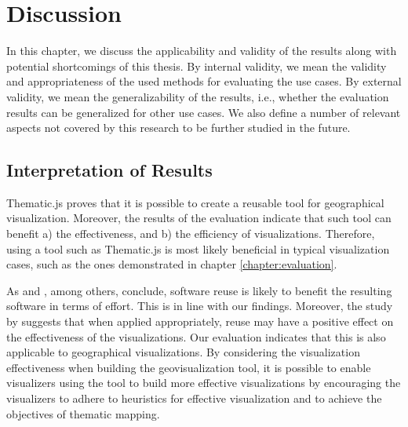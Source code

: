
\chapter{Discussion}
\label{chapter:discussion}

In this chapter, we discuss the applicability and validity of the results along with potential shortcomings of this thesis. By internal validity, we mean the validity and appropriateness of the used methods for evaluating the use cases. By external validity, we mean the generalizability of the results, i.e., whether the evaluation results can be generalized for other use cases. We also define a number of relevant aspects not covered by this research to be further studied in the future.

\section{Interpretation of Results}

Thematic.js proves that it is possible to create a reusable tool for geographical visualization. Moreover, the results of the evaluation indicate that such tool can benefit a) the effectiveness, and b) the efficiency of visualizations. Therefore, using a tool such as Thematic.js is most likely beneficial in typical visualization cases, such as the ones demonstrated in chapter \ref{chapter:evaluation}.

As \citet{boehm_managing_1999} and \citet{mohagheghi_quality_2007}, among others, conclude, software reuse is likely to benefit the resulting software in terms of effort. This is in line with our findings. Moreover, the study by \citet{bostock_protovis:_2009} suggests that when applied appropriately, reuse may have a positive effect on the effectiveness of the visualizations. Our evaluation indicates that this is also applicable to geographical visualizations. By considering the visualization effectiveness when building the geovisualization tool, it is possible to enable visualizers using the tool to build more effective visualizations by encouraging the visualizers to adhere to heuristics for effective visualization and to achieve the objectives of thematic mapping.


